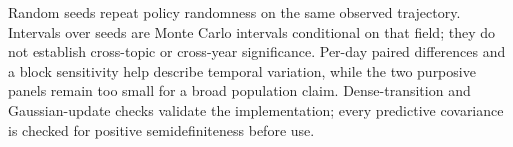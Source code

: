 Random seeds repeat policy randomness on the same observed trajectory. Intervals over seeds are Monte Carlo intervals conditional on that field; they do not establish cross-topic or cross-year significance. Per-day paired differences and a block sensitivity help describe temporal variation, while the two purposive panels remain too small for a broad population claim. Dense-transition and Gaussian-update checks validate the implementation; every predictive covariance is checked for positive semidefiniteness before use.
